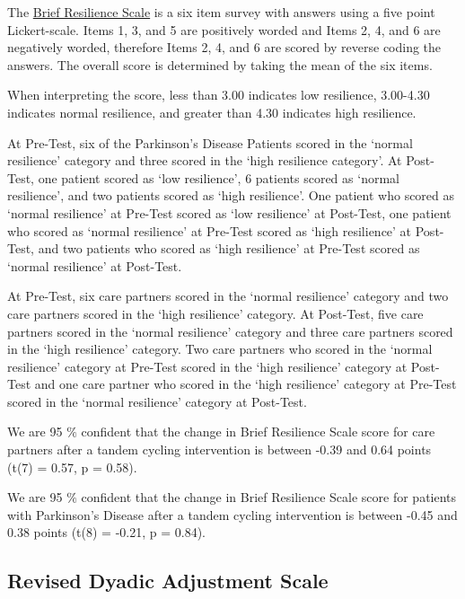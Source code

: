 \documentclass[
]{article}
\begin{document}
The
\href{https://measure.whatworkswellbeing.org/measures-bank/brief-resilience-scale/}{Brief
Resilience Scale} is a six item survey with answers using a five point
Lickert-scale. Items 1, 3, and 5 are positively worded and Items 2, 4,
and 6 are negatively worded, therefore Items 2, 4, and 6 are scored by
reverse coding the answers. The overall score is determined by taking
the mean of the six items.

When interpreting the score, less than 3.00 indicates low resilience,
3.00-4.30 indicates normal resilience, and greater than 4.30 indicates
high resilience.

At Pre-Test, six of the Parkinson's Disease Patients scored in the
`normal resilience' category and three scored in the `high resilience
category'. At Post-Test, one patient scored as `low resilience', 6
patients scored as `normal resilience', and two patients scored as `high
resilience'. One patient who scored as `normal resilience' at Pre-Test
scored as `low resilience' at Post-Test, one patient who scored as
`normal resilience' at Pre-Test scored as `high resilience' at
Post-Test, and two patients who scored as `high resilience' at Pre-Test
scored as `normal resilience' at Post-Test.

At Pre-Test, six care partners scored in the `normal resilience'
category and two care partners scored in the `high resilience' category.
At Post-Test, five care partners scored in the `normal resilience'
category and three care partners scored in the `high resilience'
category. Two care partners who scored in the `normal resilience'
category at Pre-Test scored in the `high resilience' category at
Post-Test and one care partner who scored in the `high resilience'
category at Pre-Test scored in the `normal resilience' category at
Post-Test.

We are 95 \(\%\) confident that the change in Brief Resilience Scale
score for care partners after a tandem cycling intervention is between
-0.39 and 0.64 points (t(7) = 0.57, p = 0.58).

We are 95 \(\%\) confident that the change in Brief Resilience Scale
score for patients with Parkinson's Disease after a tandem cycling
intervention is between -0.45 and 0.38 points (t(8) = -0.21, p = 0.84).

\hypertarget{revised-dyadic-adjustment-scale}{%
\subsection{Revised Dyadic Adjustment
Scale}\label{revised-dyadic-adjustment-scale}}
\end{document}
